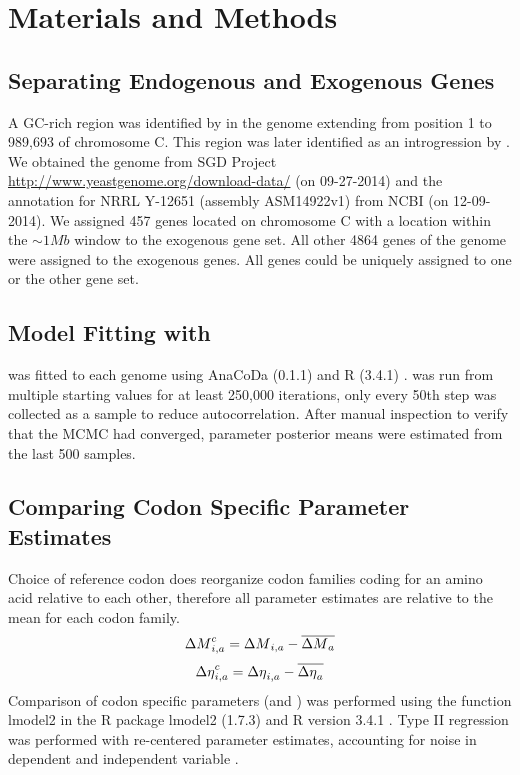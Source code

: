 \section{Materials and Methods}

\subsection{Separating Endogenous and Exogenous Genes}
A GC-rich region was identified by \citet{payen2009} in the \kluyveri genome extending from position 1 to 989,693 of chromosome C.
This region was later identified as an introgression by \citet{friedrich2015}.
We obtained the \kluyveri genome from SGD Project \url{http://www.yeastgenome.org/download-data/} (on 09-27-2014) and the annotation for \kluyveri NRRL Y-12651 (assembly ASM14922v1) from NCBI (on 12-09-2014).
We assigned 457 genes located on chromosome C with a location within the $\sim 1 Mb$ window to the exogenous gene set.
All other 4864 genes of the \kluyveri genome were assigned to the exogenous genes.
All genes could be uniquely assigned to one or the other gene set.

\subsection{Model Fitting with \ROC}
\ROC was fitted to each genome using AnaCoDa (0.1.1) \citep{landerer2018} and R (3.4.1) \citep{rcore}.
\ROC was run from multiple starting values for at least 250,000 iterations, only every 50th step was collected as a sample to reduce autocorrelation. 
After manual inspection to verify that the MCMC had converged, parameter posterior means were estimated from the last 500 samples.

\subsection{Comparing Codon Specific Parameter Estimates}
Choice of reference codon does reorganize codon families coding for an amino acid relative to each other, therefore all parameter estimates are relative to the mean for each codon family.
\begin{equation}
{\Delta M}_{i,a}^c = {\Delta M}_{i,a} - \overline{{\Delta M}_a}
\end{equation}
\begin{equation}
{\Delta \eta}_{i,a}^c = {\Delta \eta}_{i,a} - \overline{{\Delta \eta}_a}
\end{equation}
Comparison of codon specific parameters (\DM and \DE) was performed using the function lmodel2 in the R package lmodel2 (1.7.3) \citep{lmodel2} and R version 3.4.1 \citep{rcore}.
Type II regression was performed with re-centered parameter estimates, accounting for noise in dependent and independent variable \citep{SokalAndRohlf1981}.


